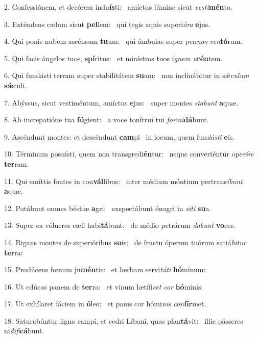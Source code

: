 2. Confessiónem, et decórem indu\textbf{ís}ti: \ast\  amíctus lúmine sicut \textit{ves}\textit{ti}\textbf{mén}to.\

3. Exténdens cælum sicut \textbf{pel}lem: \ast\  qui tegis aquis superi\textit{ó}\textit{ra} \textbf{e}jus.\

4. Qui ponis nubem ascénsum \textbf{tu}um: \ast\  qui ámbulas super pen\textit{nas} \textit{ven}\textbf{tó}rum.\

5. Qui facis ángelos tuos, \textbf{spí}ritus: \ast\  et minístros tuos i\textit{gnem} \textit{u}\textbf{rén}tem.\

6. Qui fundásti terram super stabilitátem \textbf{su}am: \ast\  non inclinábitur in sǽ\textit{cu}\textit{lum} \textbf{sǽ}culi.\

7. Abýssus, sicut vestiméntum, amíctus \textbf{e}jus: \ast\  super montes \textit{sta}\textit{bunt} \textbf{a}quæ.\

8. Ab increpatióne tua \textbf{fú}gient: \ast\  a voce tonítrui tui \textit{for}\textit{mi}\textbf{dá}bunt.\

9. Ascéndunt montes: et descéndunt \textbf{cam}pi \ast\  in locum, quem fun\textit{dás}\textit{ti} \textbf{e}is.\

10. Términum posuísti, quem non transgredi\textbf{én}tur: \ast\  neque converténtur ope\textit{rí}\textit{re} \textbf{ter}ram.\

11. Qui emíttis fontes in con\textbf{vál}libus: \ast\  inter médium móntium pertrans\textit{í}\textit{bunt} \textbf{a}quæ.\

12. Potábunt omnes béstiæ \textbf{a}gri: \ast\  exspectábunt ónagri in \textit{si}\textit{ti} \textbf{su}a.\

13. Super ea vólucres cæli habi\textbf{tá}bunt: \ast\  de médio petrárum \textit{da}\textit{bunt} \textbf{vo}ces.\

14. Rigans montes de superióribus \textbf{su}is: \ast\  de fructu óperum tuórum satiá\textit{bi}\textit{tur} \textbf{ter}ra:\

15. Prodúcens fœnum ju\textbf{mén}tis: \ast\  et herbam servi\textit{tú}\textit{ti} \textbf{hó}minum:\

16. Ut edúcas panem de \textbf{ter}ra: \ast\  et vinum lætífi\textit{cet} \textit{cor} \textbf{hó}minis:\

17. Ut exhílaret fáciem in \textbf{ó}leo: \ast\  et panis cor hómi\textit{nis} \textit{con}\textbf{fír}met.\

18. Saturabúntur ligna campi, et cedri Líbani, quas plan\textbf{tá}vit: \ast\  illic pásseres ni\textit{di}\textit{fi}\textbf{cá}bunt.\

